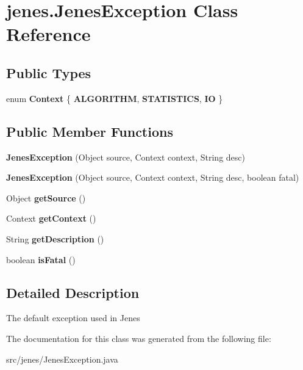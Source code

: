 \hypertarget{classjenes_1_1_jenes_exception}{
\section{jenes.JenesException Class Reference}
\label{classjenes_1_1_jenes_exception}
}
\subsection*{Public Types}
\begin{CompactItemize}
\item 
enum \textbf{Context} \{ \textbf{ALGORITHM}, 
\textbf{STATISTICS}, 
\textbf{IO}
 \}
\end{CompactItemize}
\subsection*{Public Member Functions}
\begin{CompactItemize}
\item 
\hypertarget{classjenes_1_1_jenes_exception_0896ada42c15de11ae090d00f60712e6}{
\textbf{JenesException} (Object source, Context context, String desc)}
\label{classjenes_1_1_jenes_exception_0896ada42c15de11ae090d00f60712e6}

\item 
\hypertarget{classjenes_1_1_jenes_exception_b12d2e209aa3cfe14f08b4732271d9d9}{
\textbf{JenesException} (Object source, Context context, String desc, boolean fatal)}
\label{classjenes_1_1_jenes_exception_b12d2e209aa3cfe14f08b4732271d9d9}

\item 
\hypertarget{classjenes_1_1_jenes_exception_1dc5c4b0404aeab984604002fad7dbfb}{
Object \textbf{getSource} ()}
\label{classjenes_1_1_jenes_exception_1dc5c4b0404aeab984604002fad7dbfb}

\item 
\hypertarget{classjenes_1_1_jenes_exception_9a47a0e830dda47c1f9841461fb29726}{
Context \textbf{getContext} ()}
\label{classjenes_1_1_jenes_exception_9a47a0e830dda47c1f9841461fb29726}

\item 
\hypertarget{classjenes_1_1_jenes_exception_0d37f5de0bddb6c1a3014816f217281c}{
String \textbf{getDescription} ()}
\label{classjenes_1_1_jenes_exception_0d37f5de0bddb6c1a3014816f217281c}

\item 
\hypertarget{classjenes_1_1_jenes_exception_4d673283c5e13dd3b95e73cf780e9419}{
boolean \textbf{isFatal} ()}
\label{classjenes_1_1_jenes_exception_4d673283c5e13dd3b95e73cf780e9419}

\end{CompactItemize}


\subsection{Detailed Description}
The default exception used in Jenes 

The documentation for this class was generated from the following file:\begin{CompactItemize}
\item 
src/jenes/JenesException.java\end{CompactItemize}
